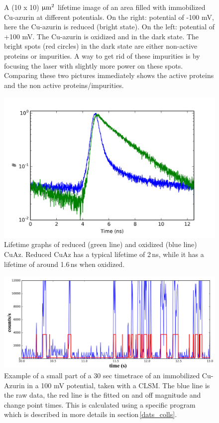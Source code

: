 \documentclass[twoside,single]{lion-msc}
\begin{document}
\begin{figure}
\begin{subfigure}{.5\textwidth}
  \label{}
\end{subfigure}
\caption{A  (10 x 10) $\upmu \textup{m}^{2}$  lifetime image of an area filled with immobilized Cu-azurin at different potentials. On the right: potential of -100 mV, here the Cu-azurin is reduced (bright state). On the left: potential of +100 mV. The Cu-azurin is oxidized and in the dark state. The bright spots (red circles) in the dark state are either non-active proteins or impurities. A way to get rid of these impurities is by focusing the laser with slightly more power on these spots. Comparing these two pictures immediately shows the active proteins and the non active proteins/impurities.}
\label{finding_proteins_1}
\end{figure}

\begin{figure}[ht!]
\centering
\includegraphics[width= .9\textwidth]{lifetime.png}
\caption{Lifetime graphs of reduced (green line) and oxidized (blue line) CuAz. Reduced CuAz has a typical lifetime of 2\,ns, while it has a lifetime of around 1.6\,ns when oxidized.} 
\label{lifetime}
\end{figure}



\begin{figure}[ht!]
\centering
\includegraphics[width= \textwidth]{tt.png}
\caption{Example of a small part of a 30 sec timetrace of an immobilized Cu-Azurin in a 100 mV potential, taken with a CLSM. The blue line is the raw data, the red line is the fitted on and off magnitude and change point times. This is calculated using a specific program which is described in more details in section\,\ref{dats_colls}.} 
\label{TT_exam}
\end{figure}
\end{document}
